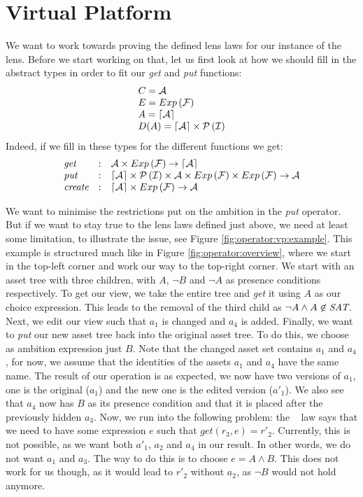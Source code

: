 \section{Virtual Platform}\label{sec:configlenses:vp}
We want to work towards proving the defined lens laws for our instance of the
lens. Before we start working on that, let us first look at how we
should fill in the abstract types in order to fit our \emph{get} and \emph{put}
functions:
\[
  \begin{array}{l}
    C = \mathcal{A} \\
    E = Exp \left( \mathcal{F} \right) \\
    A = \lceil \mathcal{A} \rceil \\
    D(A) = \lceil \mathcal{A} \rceil \times \mathcal{P} \left(\mathcal{I}\right)
  \end{array}
\]
Indeed, if we fill in these types for the different functions we get:
\[
  \begin{array}{lll}
    \textit{get} & : & \mathcal{A} \times Exp \left( \mathcal{F} \right) \rightarrow \lceil \mathcal{A} \rceil \\
    \textit{put} & : & \lceil \mathcal{A} \rceil \times \mathcal{P} \left(\mathcal{I}\right) \times \mathcal{A} \times Exp \left( \mathcal{F} \right) \times Exp \left( \mathcal{F} \right) \rightarrow \mathcal{A} \\
    \textit{create} & : & \lceil \mathcal{A} \rceil \times Exp \left( \mathcal{F} \right) \rightarrow \mathcal{A}
  \end{array}
\]

We want to minimise the restrictions put on the ambition in the \emph{put}
operator. But if we want to stay true to the lens laws defined just above, we
need at least some limitation, to illustrate the issue, see Figure
\ref{fig:operator:vp:example}. This example is structured much like in Figure
\ref{fig:operator:overview}, where we start in the top-left corner and work our
way to the top-right corner. We start with an asset tree with three
children, with $A$, $\neg B$ and $\neg A$ as presence conditions respectively.
To get our view, we take the entire tree and \emph{get} it using $A$ as our
choice expression. This leads to the removal of the third child as 
$\neg A \land A \not\in \textit{SAT}$. Next, we edit our view such that $a_1$ is
changed and $a_4$ is added. Finally, we want to \emph{put} our new asset tree
back into the original asset tree. To do this, we choose as ambition expression
just $B$. Note that the changed asset set contains $a_1$ and $a_4$, for now, we
assume that the identities of the assets $a_1$ and $a_4$ have the same name.
The result of our operation is as expected, we now have two versions of $a_1$,
one is the original ($a_1$) and the new one is the edited version ($a'_1$). We
also see that $a_4$ now has $B$ as its presence condition and that it is placed
after the previously hidden $a_3$. Now, we run into the following problem: the
\putget~ law says that we need to have some expression $e$ such that
\(\textit{get}\left(r_3, e\right) = r'_2\). Currently, this is not possible, as
we want both $a'_1$, $a_2$ and $a_4$ in our result. In other words, we do not
want $a_1$ and $a_3$. The way to do this is to choose $e = A \land B$. This
does not work for us though, as it would lead to $r'_2$ without $a_2$, as 
$\neg B$ would not hold anymore.

